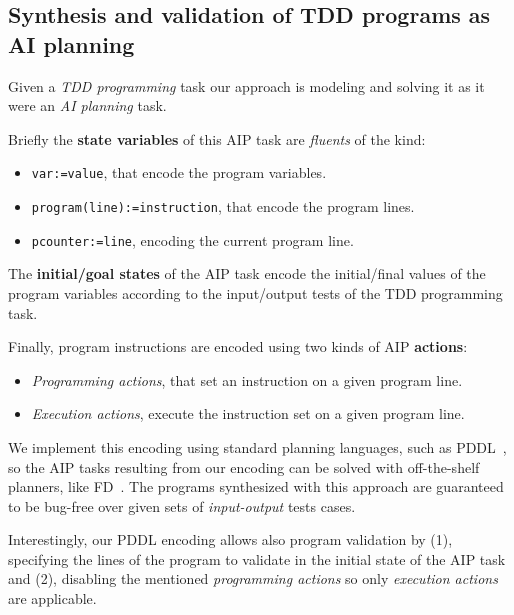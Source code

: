 \documentclass[10pt,a4paper]{paper}
\begin{document}
\subsection{Synthesis and validation of TDD programs as AI planning}
Given a {\em TDD programming} task our approach is modeling and solving it as it were an {\em AI planning} task.

Briefly the {\bf state variables} of this AIP task are {\em fluents} of the kind:
\begin{itemize}
\item {\tt var:=value}, that encode the program variables.
\item {\tt program(line):=instruction}, that encode the program lines.
\item {\tt pcounter:=line}, encoding the current program line.
\end {itemize}

The {\bf initial/goal states} of the AIP task encode the initial/final values of the program variables according to the input/output tests of the TDD programming task.

Finally, program instructions are encoded using two kinds of AIP {\bf actions}:
\begin{itemize}
\item {\it Programming actions}, that set an instruction on a given program line.
\item {\it Execution actions}, execute the instruction set on a given program line.
\end{itemize}
We implement this encoding using standard planning languages, such as PDDL~\cite{fox2003pddl2}, so the AIP tasks resulting from our encoding can be solved with off-the-shelf planners, like {\sc FD}~\cite{helmert2006fast}. The programs synthesized with this approach are guaranteed to be bug-free over given sets of {\em input-output} tests cases.

Interestingly, our PDDL encoding allows also program validation by (1), specifying the lines of the program to validate in the initial state of the AIP task and (2), disabling the mentioned {\it programming actions} so only {\it execution actions} are applicable. 
\end{document}
